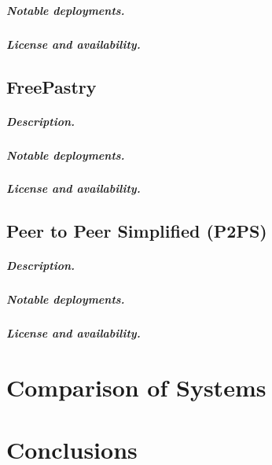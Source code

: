 \documentclass[a4paper]{report}
\begin{document}
\paragraph{Notable deployments.}

\paragraph{License and availability.}


\section{FreePastry}

\paragraph{Description.}

\paragraph{Notable deployments.}

\paragraph{License and availability.}


\section{Peer to Peer Simplified (P2PS)}

\paragraph{Description.}

\paragraph{Notable deployments.}

\paragraph{License and availability.}




\chapter{Comparison of Systems}

\chapter{Conclusions}



\end{document}
